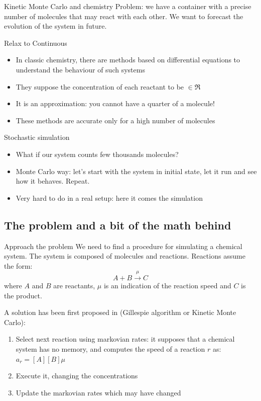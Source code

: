 \documentclass[presentation]{beamer}
\begin{document}
\begin{frame}{Kinetic Monte Carlo and chemistry}
Problem: we have a container with a precise number of molecules that may react with each other. We want to forecast the evolution of the system in future.
 \begin{block}{Relax to Continuous}
  \begin{itemize}
        \item In classic chemistry, there are methods based on differential equations to understand the behaviour of such systems
        \item They suppose the concentration of each reactant to be $\in \Re$
        \item It is an approximation: you cannot have a quarter of a molecule!
        \item These methods are accurate only for a high number of molecules
  \end{itemize}
 \end{block}
 \begin{block}{Stochastic simulation}
  \begin{itemize}
        \item What if our system counts few thousands molecules?
        \item Monte Carlo way: let's start with the system in initial state, let it run and see how it behaves. Repeat.
        \item Very hard to do in a real setup: here it comes the simulation
  \end{itemize}
 \end{block}
\end{frame}

\subsection{The problem and a bit of the math behind}
\begin{frame}{Approach the problem}
We need to find a procedure for simulating a chemical system. The system is composed of molecules and reactions. Reactions assume the form:
$$A + B\xrightarrow{\mu} C$$
where $A$ and $B$ are reactants, $\mu$ is an indication of the reaction speed and $C$ is the product.

A solution has been first proposed in \cite{GillespieJPC1977} (Gillespie algorithm or Kinetic Monte Carlo):
 \begin{enumerate}
   \item Select next reaction using markovian rates: it supposes that a chemical system has no memory, and computes the speed of a reaction $r$ as: $a_r = [A][B]\mu$
   \item Execute it, changing the concentrations
   \item Update the markovian rates which may have changed
  \end{enumerate}
\end{frame}
\end{document}
